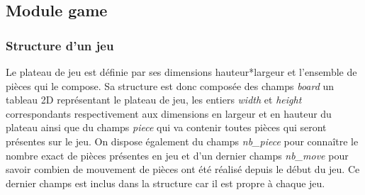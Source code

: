 \documentclass{report}
\begin{document}
\subsection{Module game}
\subsubsection{Structure d'un jeu}
Le plateau de jeu est définie par ses dimensions hauteur*largeur et l'ensemble de pièces qui le compose. Sa structure est donc composée des champs \textit{board} un tableau 2D représentant le plateau de jeu, les entiers \textit{width} et \textit{height} correspondants respectivement aux dimensions en largeur et en hauteur du plateau ainsi que du champs \textit{piece} qui va contenir toutes pièces qui seront présentes sur le jeu. On dispose également du champs \textit{nb\_piece} pour connaître le nombre exact de pièces présentes en jeu et d'un dernier champs \textit{nb\_move} pour savoir combien de mouvement de pièces ont été réalisé depuis le début du jeu. Ce dernier champs est inclus dans la structure car il est propre à chaque jeu.
\end{document}
